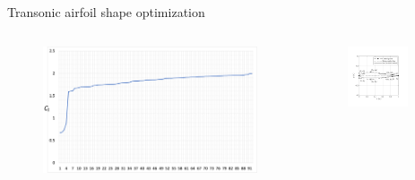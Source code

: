 \documentclass[8pt]{beamer}
\begin{document}
\begin{frame}{Transonic airfoil shape optimization}
  \begin{columns}[T]
    \begin{column}{0.5\textwidth}
      \vspace{1em}
      \begin{figure}[H]
        \includegraphics[width=1.1\textwidth]
        {Figures/results2.png}
        \end{figure}
    \end{column}
    \begin{column}{0.5\textwidth}
      \begin{center}
        \begin{figure}[H]
        \includegraphics[width=0.8\textwidth]
        {Figures/Fig20-b.pdf}
        \end{figure}
      \end{center}
    \end{column}
  \end{columns}
\end{frame}
\end{document}
